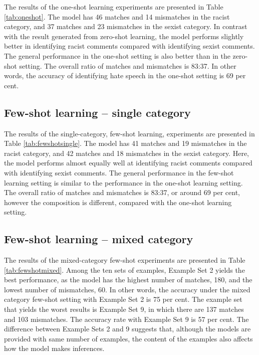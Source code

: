 \documentclass{bmcart}
\begin{document}
The results of the one-shot learning experiments are presented in Table \ref{tab:oneshot}. The model has 46 matches and 14 mismatches in the racist category, and 37 matches and 23 mismatches in the sexist category. In contrast with the result generated from zero-shot learning, the model performs slightly better in identifying racist comments compared with identifying sexist comments. The general performance in the one-shot setting is also better than in the zero-shot setting. The overall ratio of matches and mismatches is 83:37. In other words, the accuracy of identifying hate speech in the one-shot setting is 69 per cent.

\subsection{Few-shot learning -- single category}\label{few-shot-learning-single-category}

The results of the single-category, few-shot learning, experiments are presented in Table \ref{tab:fewshotsingle}. The model has 41 matches and 19 mismatches in the racist category, and 42 matches and 18 mismatches in the sexist category. Here, the model performs almost equally well at identifying racist comments compared with identifying sexist comments. The general performance in the few-shot learning setting is similar to the performance in the one-shot learning setting. The overall ratio of matches and mismatches is 83:37, or around 69 per cent, however the composition is different, compared with the one-shot learning setting.


\subsection{Few-shot learning -- mixed category}\label{few-shot-learning-mixed-category}

The results of the mixed-category few-shot experiments are presented in Table \ref{tab:fewshotmixed}. Among the ten sets of examples, Example Set 2 yields the best performance, as the model has the highest number of matches, 180, and the lowest number of mismatches, 60. In other words, the accuracy under the mixed category few-shot setting with Example Set 2 is 75 per cent. The example set that yields the worst results is Example Set 9, in which there are 137 matches and 103 mismatches. The accuracy rate with Example Set 9 is 57 per cent. The difference between Example Sets 2 and 9 suggests that, although the models are provided with same number of examples, the content of the examples also affects how the model makes inferences.
\end{document}

